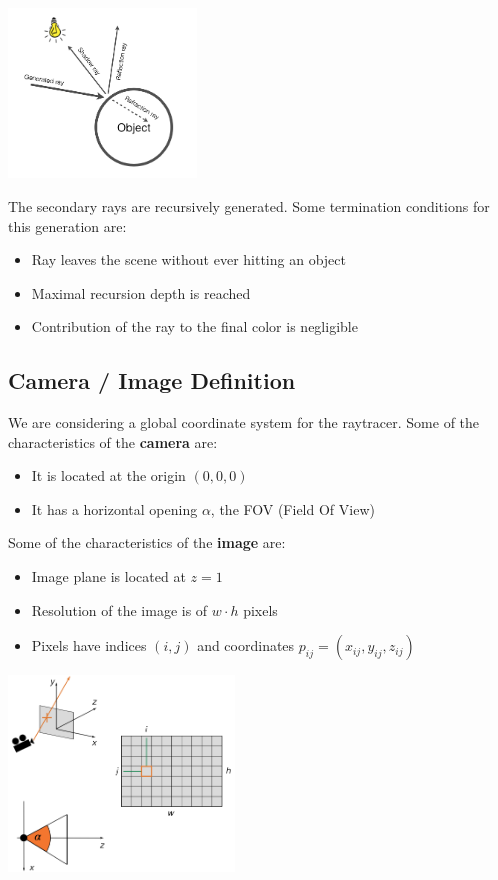 \documentclass{article}
\begin{document}
\begin{center}
	\includegraphics[width=5cm]{whitted_rt.png}
\end{center}
The secondary rays are recursively generated. Some termination conditions for this generation are:

\begin{itemize}
	\item Ray leaves the scene without ever hitting an object
	\item Maximal recursion depth is reached
	\item Contribution of the ray to the final color is negligible
\end{itemize}

\subsection{Camera / Image Definition}
We are considering a global coordinate system for the raytracer. Some of the characteristics of the \textbf{camera} are:

\begin{itemize}
	\item It is located at the origin $(0, 0, 0)$
	\item It has a horizontal opening $\alpha$, the FOV (Field Of View)
\end{itemize}
Some of the characteristics of the \textbf{image} are:

\begin{itemize}
	\item Image plane is located at $z = 1$
	\item Resolution of the image is of $w \cdot h$ pixels
	\item Pixels have indices $(i, j)$ and coordinates $p_{ij} = (x_{ij}, y_{ij}, z_{ij})$
\end{itemize}

\begin{center}
	\includegraphics[width=6cm]{scene_def.png}
\end{center}
\end{document}
